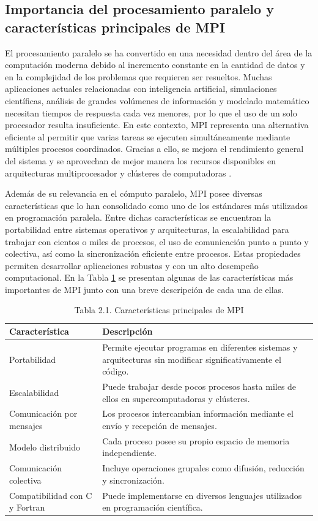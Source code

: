 \subsection{Importancia del procesamiento paralelo y características principales de MPI}

El procesamiento paralelo se ha convertido en una necesidad dentro del área de la computación moderna debido al incremento constante en la cantidad de datos y en la complejidad de los problemas que requieren ser resueltos. Muchas aplicaciones actuales relacionadas con inteligencia artificial, simulaciones científicas, análisis de grandes volúmenes de información y modelado matemático necesitan tiempos de respuesta cada vez menores, por lo que el uso de un solo procesador resulta insuficiente. En este contexto, MPI representa una alternativa eficiente al permitir que varias tareas se ejecuten simultáneamente mediante múltiples procesos coordinados. Gracias a ello, se mejora el rendimiento general del sistema y se aprovechan de mejor manera los recursos disponibles en arquitecturas multiprocesador y clústeres de computadoras \cite{ref4_frem,ref5_frem}.

Además de su relevancia en el cómputo paralelo, MPI posee diversas características que lo han consolidado como uno de los estándares más utilizados en programación paralela. Entre dichas características se encuentran la portabilidad entre sistemas operativos y arquitecturas, la escalabilidad para trabajar con cientos o miles de procesos, el uso de comunicación punto a punto y colectiva, así como la sincronización eficiente entre procesos. Estas propiedades permiten desarrollar aplicaciones robustas y con un alto desempeño computacional. En la Tabla \ref{tab:caracteristicasMPI} se presentan algunas de las características más importantes de MPI junto con una breve descripción de cada una de ellas.

\begin{table}[H]
\centering
\caption{Tabla 2.1. Características principales de MPI \cite{ref1_frem}}
\label{tab:caracteristicasMPI}
\begin{tabular}{|p{4cm}|p{9cm}|}
\hline
\textbf{Característica} & \textbf{Descripción} \\ \hline
Portabilidad & Permite ejecutar programas en diferentes sistemas y arquitecturas sin modificar significativamente el código. \\ \hline
Escalabilidad & Puede trabajar desde pocos procesos hasta miles de ellos en supercomputadoras y clústeres. \\ \hline
Comunicación por mensajes & Los procesos intercambian información mediante el envío y recepción de mensajes. \\ \hline
Modelo distribuido & Cada proceso posee su propio espacio de memoria independiente. \\ \hline
Comunicación colectiva & Incluye operaciones grupales como difusión, reducción y sincronización. \\ \hline
Compatibilidad con C y Fortran & Puede implementarse en diversos lenguajes utilizados en programación científica. \\ \hline
\end{tabular}
\end{table}

